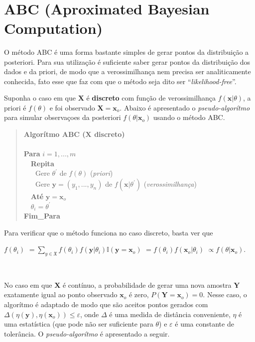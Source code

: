 \documentclass[
]{book}
\begin{document}
\(~\)

\hypertarget{abc-aproximated-bayesian-computation}{%
\section{ABC (Aproximated Bayesian Computation)}\label{abc-aproximated-bayesian-computation}}

O método ABC é uma forma bastante simples de gerar pontos da distribuição a posteriori. Para sua utilização é suficiente saber gerar pontos da distribuição dos dados e da priori, de modo que a verossimilhança nem precisa ser analiticamente conhecida, fato esse que faz com que o método seja dito ser ``\emph{likelihood-free}''.

Suponha o caso em que \(\boldsymbol X\) é \textbf{discreto} com função de verossimilhança \(f(\boldsymbol x|\theta)\), a priori é \(f(\theta)\) e foi observado \(\boldsymbol X=\boldsymbol x_o\). Abaixo é apresentado o \emph{pseudo-algorítmo} para simular observaçoes da posteriori \(f(\theta |\boldsymbol x_o)\) usando o método ABC.

\begin{quote}
\textbf{Algorítmo ABC (\(\boldsymbol X\) discreto)}\\
\(~\)\\
\textbf{Para} \(i=1,...,m\)\\
\(~~~\) \textbf{Repita}\\
\(~~~~~~\) Gere \(\theta^\prime\) de \(f(\theta)\) (\emph{priori})\\
\(~~~~~~\) Gere \(\boldsymbol y = (y_1,...,y_n)\) de \(f(\boldsymbol x|\theta^\prime)\) (\emph{verossimilhança})\\
\(~~~\) \textbf{Até} \(\boldsymbol y =\boldsymbol x_o\)\\
\(~~~\) \(\theta_i = \theta^\prime\)\\
\textbf{Fim\_Para}
\end{quote}

Para verificar que o método funciona no caso discreto, basta ver que

\(f(\theta_i)\) \(=\displaystyle \sum_{y\in \mathfrak{X}}f(\theta_i)f(\boldsymbol y|\theta_i)\mathbb{I}(\boldsymbol y = \boldsymbol x_o)\)
\(=f(\theta_i)f(\boldsymbol x_o|\theta_i)\)
\(\propto f(\theta |\boldsymbol x_o)\).

\(~\)

No caso em que \(\boldsymbol X\) é contínuo, a probabilidade de gerar uma nova amostra \(\boldsymbol Y\) exatamente igual ao ponto observado \(\boldsymbol x_o\) é zero, \(P(\boldsymbol Y=\boldsymbol x_o)=0\). Nesse caso, o algorítmo é adaptado de modo que são aceitos pontos gerados com \(\Delta\left(\eta(\boldsymbol y),\eta(\boldsymbol x_o)\right) \leq \varepsilon\), onde \(\Delta\) é uma medida de distância conveniente, \(\eta\) é uma estatística (que pode não ser suficiente para \(\theta\)) e \(\varepsilon\) é uma constante de tolerância. O \emph{pseudo-algorítmo} é apresentado a seguir.
\end{document}
